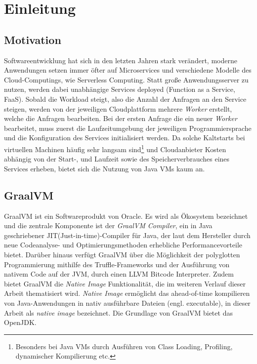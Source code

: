 \section{Einleitung}
\label{sec:einleitung}

\subsection{Motivation}
\label{subsec:motivation}
Softwareentwicklung hat sich in den letzten Jahren stark verändert, moderne Anwendungen setzen immer öfter auf Microservices und verschiedene Modelle des Cloud-Computings, wie
Serverless Computing. Statt große Anwendungsserver zu nutzen, werden dabei unabhängige Services deployed (Function as a Service, FaaS). Sobald die Workload steigt, also die Anzahl der Anfragen an den Service steigen,
werden von der jeweiligen Cloudplattform mehrere \textit{Worker} erstellt, welche die Anfragen bearbeiten. Bei der ersten Anfrage die ein neuer \textit{Worker} bearbeitet, muss zuerst die Laufzeitumgebung 
der jeweiligen Programmiersprache und die Konfiguration des Services initialisiert werden. Da solche Kaltstarts bei virtuellen Machinen häufig sehr langsam sind\footnote{Besonders bei Java VMs
 durch Ausführen von Class Loading, Profiling, dynamischer Kompilierung etc.} und Cloudanbieter Kosten abhängig von der Start-, und Laufzeit sowie des Speicherverbrauches eines Services erheben, bietet sich die Nutzung von Java VMs kaum an.

\subsection{GraalVM}
\label{subsec:graalvm}

GraalVM ist ein Softwareprodukt von Oracle. Es wird als Ökosystem bezeichnet und die zentrale Komponente ist der \textit{GraalVM Compiler}, ein in Java geschriebener JIT(Just-in-time)-Compiler für Java, der laut dem Hersteller durch neue Codeanalyse- und 
 Optimierungsmethoden erhebliche Performancevorteile bietet.
Darüber hinaus verfügt GraalVM über die Möglichkeit der polyglotten Programmierung mithilfe des Truffle-Frameworks und der Ausführung von nativem Code auf der JVM, durch einen LLVM Bitcode Interpreter.
Zudem bietet GraalVM die \textit{Native Image} Funktionalität, die im weiteren Verlauf dieser Arbeit thematisiert wird. \textit{Native Image} ermöglicht das ahead-of-time kompilieren von Java-Anwendungen in nativ ausführbare Dateien (engl. executable), in dieser Arbeit als \textit{native image} bezeichnet.
Die Grundlage von GraalVM bietet das OpenJDK\parencite{GraalComponents}.\newline

